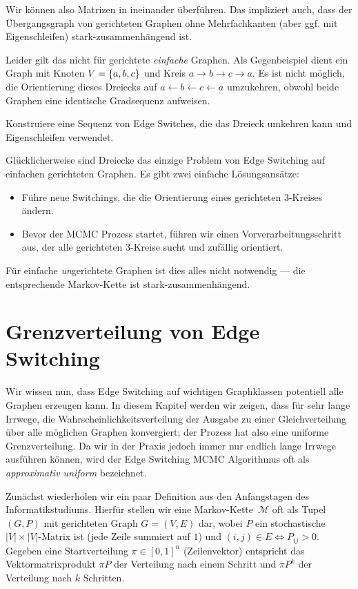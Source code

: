 Wir können also Matrizen in \msz ineinander überführen.
Das impliziert auch, dass der Übergangsgraph von gerichteten Graphen ohne Mehrfachkanten (aber ggf. mit Eigenschleifen) stark-zusammenhängend ist.

Leider gilt das nicht für gerichtete \emph{einfache} Graphen.
Als Gegenbeispiel dient ein Graph mit Knoten $V = \left\{a,b,c\right\}$ und Kreis $a \to b \to c \to a$.
Es ist nicht möglich, die Orientierung dieses Dreiecks auf $a \leftarrow b \leftarrow c \leftarrow a$ umzukehren, obwohl beide Graphen eine identische Gradsequenz aufweisen.

\begin{exercise}
    Konstruiere eine Sequenz von Edge Switches, die das Dreieck umkehren kann und Eigenschleifen verwendet.
\end{exercise}

Glücklicherweise sind Dreiecke das einzige Problem von Edge Switching auf einfachen gerichteten Graphen.
Es gibt zwei einfache Lösungsansätze:
\begin{itemize}
    \item Führe neue Switchings, die die Orientierung eines gerichteten 3-Kreises ändern.
    \item Bevor der MCMC Prozess startet, führen wir einen Vorverarbeitungsschritt aus, der alle gerichteten 3-Kreise sucht und zufällig orientiert.
\end{itemize}

Für einfache \emph{un}gerichtete Graphen ist dies alles nicht notwendig --- die entsprechende Markov-Kette ist stark-zusammenhängend.

\section{Grenzverteilung von Edge Switching}
Wir wissen nun, dass Edge Switching auf wichtigen Graphklassen potentiell alle Graphen erzeugen kann.
In diesem Kapitel werden wir zeigen, dass für sehr lange Irrwege, die Wahrscheinlichkeitsverteilung der Ausgabe zu einer Gleichverteilung über alle möglichen Graphen konvergiert;
der Prozess hat also eine uniforme Grenzverteilung.
Da wir in der Praxis jedoch immer nur endlich lange Irrwege ausführen können, wird der Edge Switching MCMC Algorithmus oft als \emph{approximativ uniform} bezeichnet.

Zunächst wiederholen wir ein paar Definition aus den Anfangstagen des Informatikstudiums.
Hierfür stellen wir eine Markov-Kette~$\mathcal M$ oft als Tupel $(G, P)$ mit gerichteten Graph $G = (V, E)$ dar, wobei $P$ ein stochastische $|V| \times |V|$-Matrix ist (\dh jede Zeile summiert auf $1$) und $(i, j) \in E \Leftrightarrow P_{ij} > 0$.
Gegeben eine Startverteilung $\pi \in [0, 1]^n$ (Zeilenvektor) entspricht das Vektormatrixprodukt $\pi P$ der Verteilung nach einem Schritt und $\pi P^k$ der Verteilung nach $k$ Schritten.

